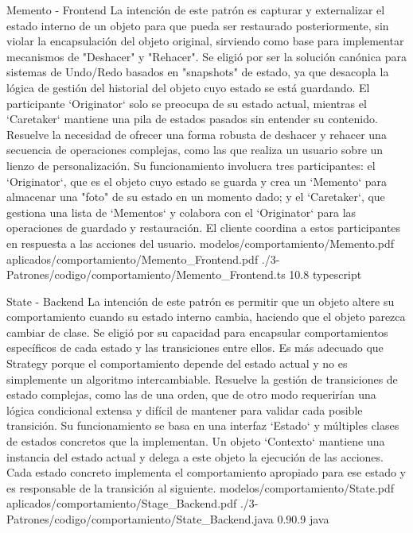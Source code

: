 \Patron
    {Memento - Frontend}
    {La intención de este patrón es capturar y externalizar el estado interno de un objeto para que pueda ser restaurado posteriormente, sin violar la encapsulación del objeto original, sirviendo como base para implementar mecanismos de "Deshacer" y "Rehacer". Se eligió por ser la solución canónica para sistemas de Undo/Redo basados en "snapshots" de estado, ya que desacopla la lógica de gestión del historial del objeto cuyo estado se está guardando. El participante `Originator` solo se preocupa de su estado actual, mientras el `Caretaker` mantiene una pila de estados pasados sin entender su contenido.}
    {Resuelve la necesidad de ofrecer una forma robusta de deshacer y rehacer una secuencia de operaciones complejas, como las que realiza un usuario sobre un lienzo de personalización. Su funcionamiento involucra tres participantes: el `Originator`, que es el objeto cuyo estado se guarda y crea un `Memento` para almacenar una "foto" de su estado en un momento dado; y el `Caretaker`, que gestiona una lista de `Mementos` y colabora con el `Originator` para las operaciones de guardado y restauración. El cliente coordina a estos participantes en respuesta a las acciones del usuario.}
    {modelos/comportamiento/Memento.pdf}
    {aplicados/comportamiento/Memento_Frontend.pdf}
    {./3-Patrones/codigo/comportamiento/Memento_Frontend.ts}
    {1}{0.8}
    {typescript}
\newpage

\Patron
    {State - Backend}
    {La intención de este patrón es permitir que un objeto altere su comportamiento cuando su estado interno cambia, haciendo que el objeto parezca cambiar de clase. Se eligió por su capacidad para encapsular comportamientos específicos de cada estado y las transiciones entre ellos. Es más adecuado que Strategy porque el comportamiento depende del estado actual y no es simplemente un algoritmo intercambiable.}
    {Resuelve la gestión de transiciones de estado complejas, como las de una orden, que de otro modo requerirían una lógica condicional extensa y difícil de mantener para validar cada posible transición. Su funcionamiento se basa en una interfaz `Estado` y múltiples clases de estados concretos que la implementan. Un objeto `Contexto` mantiene una instancia del estado actual y delega a este objeto la ejecución de las acciones. Cada estado concreto implementa el comportamiento apropiado para ese estado y es responsable de la transición al siguiente.}
    {modelos/comportamiento/State.pdf}
    {aplicados/comportamiento/Stage_Backend.pdf}
    {./3-Patrones/codigo/comportamiento/State_Backend.java}
    {0.9}{0.9}
    {java}
\newpage

